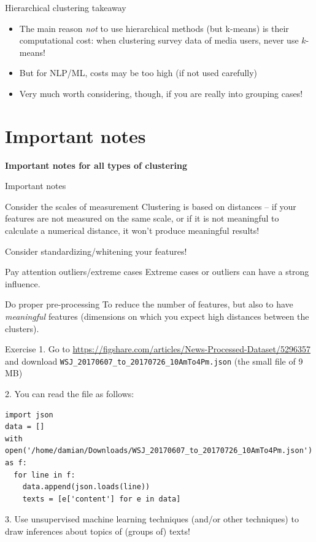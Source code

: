 \documentclass[compress]{beamer}
\begin{document}
\begin{frame}{Hierarchical clustering takeaway}
\begin{itemize}
\item The main reason \emph{not} to use hierarchical methods (but k-means) is their computational cost: when clustering survey data of media users, never use $k$-means!
\item But for NLP/ML, costs may be too high (if not used carefully)
\item Very much worth considering, though, if you are really into grouping cases!
\end{itemize}
\end{frame}


\section{Important notes}
\begin{frame}[plain]
\textbf{Important notes for all types of clustering}
\end{frame}


\begin{frame}{Important notes}
\begin{block}{Consider the scales of measurement}
Clustering is based on distances -- if your features are not measured on the same scale, or if it is not meaningful to calculate a numerical distance, it won't produce meaningful results!

Consider standardizing/whitening your features!
\end{block}

\pause

\begin{block}{Pay attention outliers/extreme cases}
Extreme cases or outliers can have a strong influence.
\end{block}

\pause 
\begin{block}{Do proper pre-processing}
To reduce the number of features, but also to have \emph{meaningful} features (dimensions on which you expect high distances between the clusters).
\end{block}


\end{frame}



\begin{frame}{Exercise }
1. Go to \url{https://figshare.com/articles/News-Processed-Dataset/5296357} and download \texttt{WSJ\_20170607\_to\_20170726\_10AmTo4Pm.json} (the small file of 9 MB)


2. You can read the file as follows:

\begin{lstlisting}
import json
data = []
with   open('/home/damian/Downloads/WSJ_20170607_to_20170726_10AmTo4Pm.json') as f:
  for line in f:
    data.append(json.loads(line))
    texts = [e['content'] for e in data]
\end{lstlisting}


3. Use unsupervised machine learning techniques (and/or other techniques) to draw inferences about topics of (groups of) texts!
\end{frame}
\end{document}
